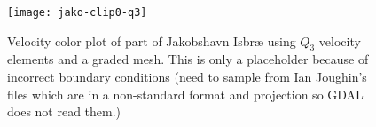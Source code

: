 
\begin{figure}
  \centering\texttt{[image: jako-clip0-q3]}
  \caption{Velocity color plot of part of Jakobshavn Isbr{\ae} using $Q_3$ velocity elements and a graded mesh. This is only a placeholder because of incorrect boundary conditions (need to sample from Ian Joughin's files which are in a non-standard format and projection so GDAL does not read them.)}\label{fig:jako-clip}
\end{figure}


%
%
%
%

% 
